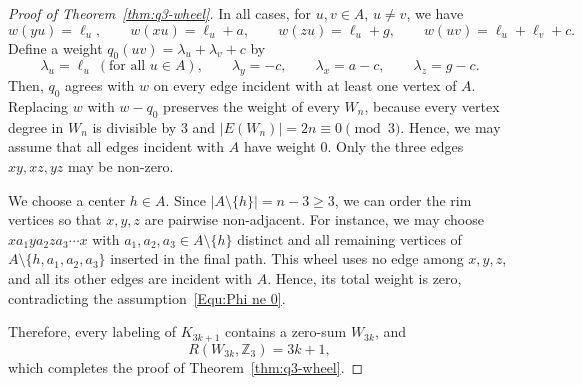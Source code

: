 \documentclass[10pt,a4paper]{amsart}
\newcommand{\Z}{\mathbb Z}
\begin{document}
\begin{proof}[Proof of Theorem~\ref{thm:q3-wheel}]
    In all cases, for $u,v\in A$, $u\ne v$, we have
    \begin{equation}\label{Equ:wheel structure}
        w(yu)=\ell_u,
        \qquad
        w(xu)=\ell_u+a,
        \qquad
        w(zu)=\ell_u+g,
        \qquad
        w(uv)=\ell_u+\ell_v+c.
    \end{equation}
    Define a weight $q_0(uv)=\lambda_u+\lambda_v+c$ by
    \[
        \lambda_u=\ell_u\ (\text{for all }u\in A),
        \qquad
        \lambda_y=-c,
        \qquad
        \lambda_x=a-c,
        \qquad
        \lambda_z=g-c.
    \]
    Then, $q_0$ agrees with $w$ on every edge incident with at least one vertex of $A$.  Replacing $w$ with $w-q_0$ preserves the weight of every $W_n$, because every vertex degree in $W_n$ is divisible by $3$ and $|E(W_n)|=2n\equiv0\pmod3$.
    Hence, we may assume that all edges incident with $A$ have weight $0$.
    Only the three edges $xy,xz,yz$ may be non-zero.

    We choose a center $h\in A$.
    Since $|A\setminus\{h\}|=n-3\ge3$, we can order the rim vertices so that $x,y,z$ are pairwise non-adjacent.
    For instance, we may choose $xa_1ya_2za_3\cdots x$
    with $a_1,a_2,a_3\in A\setminus\{h\}$ distinct and all remaining vertices of $A\setminus\{h,a_1,a_2,a_3\}$ inserted in the final path.
    This wheel uses no edge among $x,y,z$, and all its other edges are incident with $A$.
    Hence, its total weight is zero, contradicting the assumption~\eqref{Equ:Phi ne 0}.

    Therefore, every labeling of $K_{3k+1}$ contains a zero-sum $W_{3k}$, and
    \[
        R(W_{3k},\Z_3)=3k+1,
    \]
    which completes the proof of Theorem~\ref{thm:q3-wheel}.
\end{proof}
\end{document}
